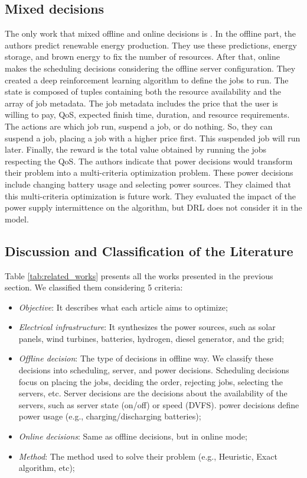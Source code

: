 \subsection{Mixed decisions}

The only work that mixed offline and online decisions is \cite{venkataswamy2023rare}. In the offline part, the authors predict renewable energy production. They use these predictions, energy storage, and brown energy to fix the number of resources. After that, online makes the scheduling decisions considering the offline server configuration. They created a deep reinforcement learning algorithm to define the jobs to run. The state is composed of tuples containing both the resource availability and the array of job metadata. The job metadata includes the price that the user is willing to pay, QoS, expected finish time, duration, and resource requirements. The actions are which job run, suspend a job, or do nothing. So, they can suspend a job, placing a job with a higher price first. This suspended job will run later. Finally, the reward is the total value obtained by running the jobs respecting the QoS. The authors indicate that power decisions would transform their problem into a multi-criteria optimization problem. These power decisions include changing battery usage and selecting power sources. They claimed that this multi-criteria optimization is future work. They evaluated the impact of the power supply intermittence on the algorithm, but DRL does not consider it in the model.

\subsection{Discussion and Classification of the Literature}
Table \ref{tab:related_works} presents all the works presented in the previous section. We classified them considering 5 criteria:

\begin{itemize}
    \item \textit{Objective}: It describes what each article aims to optimize;
    \item \textit{Electrical infrastructure}: It synthesizes the power sources, such as solar panels, wind turbines, batteries, hydrogen, diesel generator, and the grid;
    \item \textit{Offline decision}: The type of decisions in offline way. We classify these decisions into scheduling, server, and power decisions. Scheduling decisions focus on placing the jobs, deciding the order, rejecting jobs, selecting the servers, etc. Server decisions are the decisions about the availability of the servers, such as server state (on/off) or speed (DVFS). power decisions define power usage (e.g., charging/discharging batteries);
    \item \textit{Online decisions}: Same as offline decisions, but in online mode;
    \item \textit{Method}: The method used to solve their problem (e.g., Heuristic, Exact algorithm, etc);
\end{itemize}

